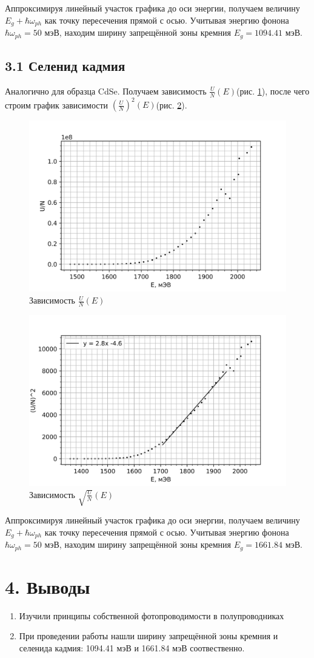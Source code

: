 \documentclass[a4paper,12pt]{report}
\begin{document}
    Аппроксимируя линейный участок графика до оси энергии, получаем величину $E_g+\hbar\omega_{ph}$ как точку пересечения прямой с осью. Учитывая энергию фонона $\hbar\omega_{ph}=50$ мэВ, находим ширину запрещённой зоны кремния $E_g=1094.41$ мэВ.
    
    \subsection*{3.1 Селенид кадмия}
   Аналогично для образца CdSe. Получаем зависимость $\frac{U}{N}(E)$(рис. \ref{CdSe}), после чего строим график зависимости $(\frac{U}{N})^2(E)$(рис. \ref{CdSe_add}).
    \begin{figure}[H]
        \centering
        \includegraphics[width=0.6\linewidth]{CdSe.png}
        \caption{Зависимость $\frac{U}{N}(E)$} \label{CdSe}
    \end{figure}
    
    \begin{figure}[H]
        \centering
        \includegraphics[width=0.6\linewidth]{CdSe_add.png}
        \caption{Зависимость $\sqrt{\frac{U}{N}}(E)$} \label{CdSe_add}
    \end{figure}

    Аппроксимируя линейный участок графика до оси энергии, получаем величину $E_g+\hbar\omega_{ph}$ как точку пересечения прямой с осью. Учитывая энергию фонона $\hbar\omega_{ph}=50$ мэВ, находим ширину запрещённой зоны кремния $E_g=1661.84$ мэВ.
    \section*{4. Выводы}
    \begin{enumerate}
        \item Изучили принципы собственной фотопроводимости в полупроводниках
        \item При проведении работы нашли ширину запрещённой зоны кремния и селенида кадмия: 1094.41 мэВ и 1661.84 мэВ соотвественно.
    \end{enumerate}
\end{document}
